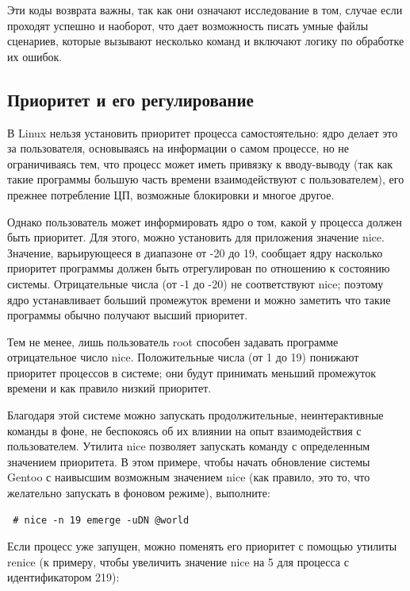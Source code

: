 \documentclass[10pt]{book}
\begin{document}
Эти коды возврата важны, так как они означают исследование в том, случае если проходят успешно и наоборот, что дает возможность писать умные файлы сценариев, которые вызывают несколько команд и включают логику по обработке их ошибок.

\subsection{Приоритет и его регулирование}
В Linux нельзя установить приоритет процесса самостоятельно: ядро делает это за пользователя, основываясь на информации о самом процессе, но не ограничиваясь тем, что процесс может иметь привязку к вводу-выводу (так как такие программы большую часть времени взаимодействуют с пользователем), его прежнее потребление ЦП, возможные блокировки и многое другое. 

Однако пользователь может информировать ядро о том, какой у процесса должен быть приоритет. Для этого, можно установить для приложения значение nice. Значение, варьирующееся в диапазоне от -20 до 19, сообщает ядру насколько приоритет программы должен быть отрегулирован по отношению к состоянию системы. Отрицательные числа (от -1 до -20) не  соответствуют nice; поэтому ядро устанавливает больший промежуток времени и можно заметить что такие программы обычно получают высший приоритет. 

Тем не менее, лишь пользователь root способен задавать программе отрицательное число nice. Положительные числа (от 1 до 19) понижают приоритет процессов в системе; они будут принимать меньший промежуток времени и как правило низкий приоритет. 

Благодаря этой системе можно запускать продолжительные, неинтерактивные команды в фоне, не беспокоясь об их влиянии на опыт взаимодействия с пользователем. Утилита nice позволяет запускать команду с определенным значением приоритета. 
В этом примере, чтобы начать обновление системы Gentoo с наивысшим возможным значением nice (как правило, это то, что желательно запускать в фоновом режиме), выполните:

\vspace{3mm}
\begin{tcolorbox}
\begin{lstlisting}
 # nice -n 19 emerge -uDN @world
\end{lstlisting}
\end{tcolorbox}
Если процесс уже запущен, можно поменять его приоритет с помощью утилиты renice (к примеру, чтобы увеличить значение nice на 5 для процесса с идентификатором 219):
\end{document}
